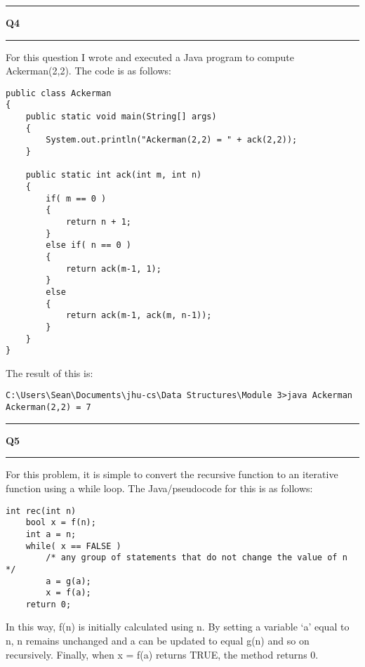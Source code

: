 \documentclass[11pt]{article}
\newcommand\question[2]{\vspace{.25in}\hrule\textbf{#1 #2}\vspace{.5em}\hrule\vspace{.10in}}
\begin{document}
\question{Q4}{}
For this question I wrote and executed a Java program to compute Ackerman(2,2). The code is as follows:
\begin{lstlisting}
public class Ackerman
{
    public static void main(String[] args)
    {
        System.out.println("Ackerman(2,2) = " + ack(2,2));
    }

    public static int ack(int m, int n)
    {
        if( m == 0 )
        {
            return n + 1;
        }
        else if( n == 0 )
        {
            return ack(m-1, 1);
        }
        else
        {
            return ack(m-1, ack(m, n-1));
        }
    }
}
\end{lstlisting}
The result of this is:
\begin{lstlisting}
C:\Users\Sean\Documents\jhu-cs\Data Structures\Module 3>java Ackerman
Ackerman(2,2) = 7
\end{lstlisting}

\question{Q5}{}
For this problem, it is simple to convert the recursive function to an iterative function using a while loop. The Java/pseudocode for this is as follows:
\begin{lstlisting}
int rec(int n)
	bool x = f(n);
	int a = n;
	while( x == FALSE )
		/* any group of statements that do not change the value of n */
		a = g(a);
		x = f(a);
	return 0;
\end{lstlisting}
In this way, f(n) is initially calculated using n. By setting a variable `a' equal to n, n remains unchanged and a can be updated to equal g(n) and so on recursively. Finally, when x = f(a) returns TRUE, the method returns 0.
\end{document}
